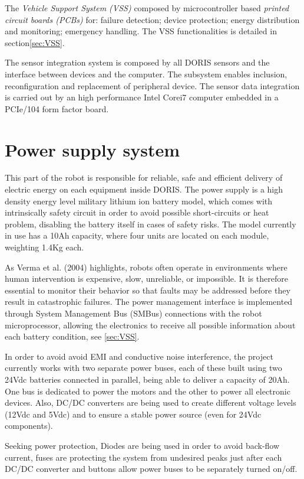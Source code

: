 \documentclass{ifacconf}
\begin{document}
The \emph{Vehicle Support System (VSS)} composed by microcontroller based
\emph{printed circuit boards (PCBs)} for: failure detection; device protection;
energy distribution and monitoring; emergency handling\cite{MARIUS}. The VSS
functionalities is detailed in section\ref{sec:VSS}. 

The sensor integration system is composed by all DORIS sensors and the interface
between devices and the computer. The subsystem enables inclusion,
reconfiguration and replacement of peripheral device. The sensor data
integration is carried out by an high performance Intel\textregistered
Core\texttrademark i7 computer embedded in a PCIe/104 form factor board.
  
\section{Power supply system}\label{sec:powersupply_overview}
This part of the robot is responsible for reliable, safe and efficient delivery
of electric energy on each equipment inside DORIS. The power supply is a high
density energy level military lithium ion battery model, which comes with
intrinsically safety circuit in order to avoid possible short-circuits or heat
problem, disabling the battery itself in cases of safety risks. The model
currently in use has a 10Ah capacity, where four units are located on each
module, weighting 1.4Kg each.

As Verma et al. (2004) highlights, robots often operate in environments where
human intervention is expensive, slow, unreliable, or impossible. It is
therefore essential to monitor their behavior so that faults may be addressed
before they result in catastrophic failures. The power management interface is
implemented through System Management Bus (SMBus) connections with the robot
microprocessor, allowing the electronics to receive all possible information
about each battery condition, see \ref{sec:VSS}. 

In order to avoid avoid EMI and conductive noise interference, the project
currently works with two separate power buses, each of these built using two
24Vdc batteries connected in parallel, being able to deliver a capacity of
20Ah. One bus is dedicated to power the motors and the other to power all
electronic devices. Also, DC/DC converters are
being used to create different voltage levels (12Vdc and 5Vdc) and to
ensure a stable power source (even for 24Vdc components). 

Seeking power protection, Diodes are being used in order to avoid back-flow
current, fuses are protecting the system from undesired peaks just after each
DC/DC converter and buttons allow power buses to be separately turned on/off.
\end{document}
